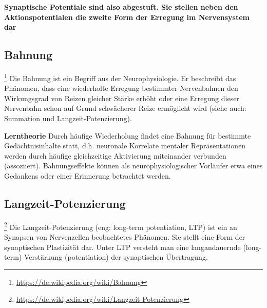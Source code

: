 \textbf{Synaptische Potentiale sind also abgestuft. Sie stellen neben den Aktionspotentialen die zweite Form der Erregung im Nervensystem dar}

\subsection{Bahnung}\footnote{\url{https://de.wikipedia.org/wiki/Bahnung}}
Die Bahnung ist ein Begriff aus der Neurophysiologie. Er beschreibt das Phänomen, dass eine wiederholte Erregung bestimmter Nervenbahnen den Wirkungsgrad von Reizen gleicher Stärke erhöht oder eine Erregung dieser Nervenbahn schon auf Grund schwächerer Reize ermöglicht wird (siehe auch: Summation und Langzeit-Potenzierung).

\textbf{Lerntheorie}
Durch häufige Wiederholung findet eine Bahnung für bestimmte Gedächtnisinhalte statt, d.h. neuronale Korrelate mentaler Repräsentationen werden durch häufige gleichzeitige Aktivierung miteinander verbunden (assoziiert). Bahnungseffekte können als neurophysiologischer Vorläufer etwa eines Gedankens oder einer Erinnerung betrachtet werden.

\subsection{Langzeit-Potenzierung}\footnote{\url{https://de.wikipedia.org/wiki/Langzeit-Potenzierung}}
Die Langzeit-Potenzierung (eng: long-term potentiation, LTP) ist ein an Synapsen von Nervenzellen beobachtetes Phänomen. Sie stellt eine Form der synaptischen Plastizität dar. Unter LTP versteht man eine langandauernde (long-term) Verstärkung (potentiation) der synaptischen Übertragung.